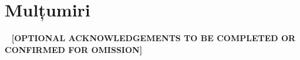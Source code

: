 \chapter*{Mulțumiri}
~
\textbf{[OPTIONAL ACKNOWLEDGEMENTS TO BE COMPLETED OR CONFIRMED FOR OMISSION]}
